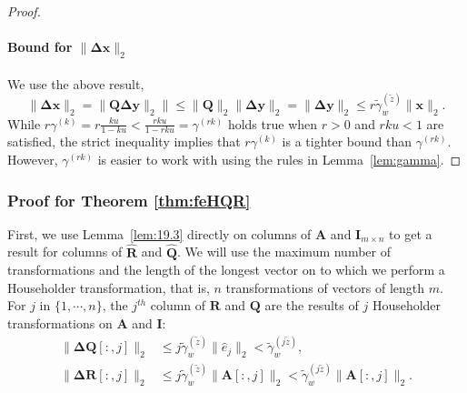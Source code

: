 \documentclass[review,onefignum,onetabnum]{siamart190516}
\newcommand{\bb}[1]{\mathbf{#1}}
\begin{document}
\begin{proof}
	\paragraph{Bound for $\|\bb{\Delta x}\|_2$}
	We use the above result,
	\begin{equation}
	\|\bb{\Delta x}\|_2 = \|\bb{Q \Delta y}\|_2\| \leq \|\bb{Q}\|_2\|\bb{\Delta y}\|_2 = \|\bb{\Delta y}\|_2 \leq  r\tilde{\gamma}_w^{(\tilde{z})}\|\bb{x}\|_2.
	\end{equation}
	While $r\gamma^{(k)} = r\frac{ku}{1-ku} < \frac{rku}{1-rku} =\gamma^{(rk)}$ holds true when $r>0$ and $rku< 1$ are satisfied, the strict inequality implies that $r\gamma^{(k)}$ is a tighter bound than $\gamma^{(rk)}$.
	However, $\gamma^{(rk)}$ is easier to work with using the rules in Lemma~\ref{lem:gamma}.
\end{proof}

\subsubsection{Proof for Theorem \ref{thm:feHQR}}
First, we use Lemma~\ref{lem:19.3} directly on columns of $\bb{A}$ and $\bb{I}_{m\times n}$ to get a result for columns of $\hat{\bb{R}}$ and $\hat{\bb{Q}}$.
We will use the maximum number of transformations and the length of the longest vector on to which we perform a Householder transformation, that is, $n$ transformations of vectors of length $m$. 
For $j$ in $\{1, \cdots, n\}$, the $j^{th}$ column of $\bb{R}$ and $\bb{Q}$ are the results of $j$ Householder transformations on $\bb{A}$ and $\bb{I}$:
\begin{align}
\|\bb{\Delta Q}[:,j]\|_2 &\leq j\tilde{\gamma}_w^{(\tilde{z})}\|\hat{e}_{j}\|_2 < \tilde{\gamma}_w^{(j\tilde{z})}, \\
\|\bb{\Delta R}[:,j]\|_2 &\leq j\tilde{\gamma}_w^{(\tilde{z})}\|\bb{A}[:,j]\|_2 < \tilde{\gamma}_w^{(j\tilde{z})}\|\bb{A}[:,j]\|_2.
\end{align}
\end{document}
